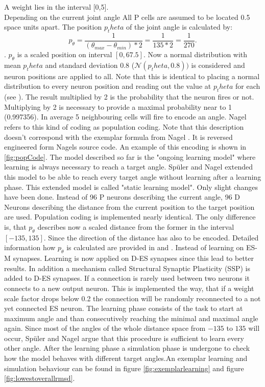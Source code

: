 A weight lies in the interval [0,5].\\
Depending on the current joint angle
All P cells are assumed to be located 0.5 space units apart. The position $p_theta$ of the joint angle is calculated by:
\begin{equation*}
	p_\theta=\dfrac{1}{(\theta_{max}-\theta_{min})*2} =\dfrac{1}{135*2}=\dfrac{1}{270}.
\end{equation*}.
$p_\theta$ is a scaled position on interval $[0,67.5]$.
Now a normal distribution with mean $p_theta$ and standard deviation $0.8$ ($\mathcal{N}(p_theta,0.8))$ is considered and neuron positions are applied to all.  Note that this is identical to placing a normal distribution to every neuron position and reading out the value at $p_theta$ for each (see \cite{mallot2013computational}).
The result multiplied by 2 is the probability that the neuron fires or not. Multiplying by 2 is necessary to provide a maximal probability near to 1 (0.997356). In average 5 neighbouring cells will fire to encode an angle. Nagel \cite{sebastianMasterThesis} refers to this kind of coding as population coding.  Note that this description doesn't correspond with the exemplar formula from Nagel \cite[p 18]{sebastianMasterThesis}. It is reversed engineered form Nagels source code. An example of this encoding is shown in \ref{fig:popCode}.
The model described so far is the "ongoing learning model" where learning is always necessary to reach a target angle.
Spüler and Nagel extended this model to be able to reach every target angle without learning after a learning phase.
This extended model is called "static learning model".
Only slight changes have been done. Instead of 96 P neurons describing the current angle, 96 D Neurons describing the distance from the current position to the target position are used.  Population coding is implemented nearly identical.  The only difference is, that $p_\theta$ describes now a scaled distance from the former in the interval $[-135,135]$. Since the direction of the distance has also to be encoded. Detailed information how $p_\theta$ is calculated are provided in \cite[p. 41-43]{sebastianMasterThesis} and \cite{sebastianPaper}.
Instead of learning on ES-M synapses. Learning is now applied on D-ES synapses since this lead to better results.
In addition a mechanism called Structural Synaptic Plasticity (SSP) is added to D-ES synapses. If a connection is rarely used between two neurons it connects to a new output neuron. This is implemented the way, that if a weight scale factor drops below 0.2 the connection will be randomly reconnected to a not yet connected ES neuron.  The learning phase consists of the task to start at maximum angle and than consecutively reaching the minimal and maximal angle again. Since most of the angles of the whole distance space from  $-135$ to $135$ will occur, Spüler and Nagel argue that this procedure is sufficient to learn every other angle.  After the learning phase a simulation phase is undergone to check how the model behaves with different target angles.An exemplar learning and simulation behaviour can be found in figure \ref{fig:exemplarlearning} and figure \ref{fig:lowestoverallrmsd}.

